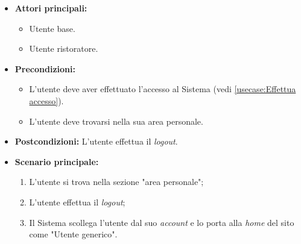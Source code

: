 \label{usecase:Logout}
\begin{itemize}
	\item \textbf{Attori principali:}
	\begin{itemize}
		\item Utente base.
		\item Utente ristoratore. 
	\end{itemize}

	\item \textbf{Precondizioni:}
	\begin{itemize}
        \item L'utente deve aver effettuato l'accesso al Sistema (vedi \autoref{usecase:Effettua accesso}).
        \item L'utente deve trovarsi nella sua area personale.
    \end{itemize}

	\item \textbf{Postcondizioni:} L'utente effettua il \textit{logout}.

	\item \textbf{Scenario principale:}
	      \begin{enumerate}
		      \item L'utente si trova nella sezione "area personale";
		      \item L'utente effettua il \textit{logout};
              \item Il Sistema scollega l'utente dal suo \textit{account} e lo porta alla \textit{home} del sito come "Utente generico".
	      \end{enumerate}
\end{itemize}
